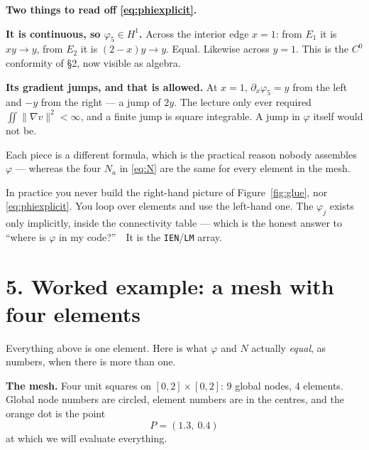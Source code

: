 \documentclass[11pt]{article}
\newcommand{\grad}{\nabla}
\begin{document}
\medskip
\textbf{Two things to read off \eqref{eq:phiexplicit}.}
\begin{steps}
\item \textbf{It is continuous, so $\varphi_{5}\in H^{1}$.} Across the interior
      edge $x=1$: from $E_{1}$ it is $xy\to y$, from $E_{2}$ it is
      $(2-x)y\to y$. Equal. Likewise across $y=1$. This is the $C^{0}$
      conformity of \S2, now visible as algebra.
\item \textbf{Its gradient jumps, and that is allowed.} At $x=1$,
      $\partial_{x}\varphi_{5}=y$ from the left and $-y$ from the right --- a
      jump of $2y$. The lecture only ever required
      $\iint\|\grad v\|^{2}<\infty$, and a finite jump is square integrable.
      A jump in $\varphi$ itself would not be.
\item Each piece is a different formula, which is the practical reason nobody
      assembles $\varphi$ --- whereas the four $N_{a}$ in \eqref{eq:N} are the
      same for every element in the mesh.
\end{steps}

\medskip
{\small\color{black!60}In practice you never build the right-hand picture of
Figure~\ref{fig:glue}, nor \eqref{eq:phiexplicit}. You loop over elements and use the
left-hand one. The $\varphi_{j}$ exists only implicitly, inside the
connectivity table --- which is the honest answer to ``where is $\varphi$ in my
code?''\ \ It is the \texttt{IEN}/\texttt{LM} array.}

\section*{5. Worked example: a mesh with four elements}

Everything above is one element. Here is what $\varphi$ and $N$ actually
\emph{equal}, as numbers, when there is more than one.

\medskip
\textbf{The mesh.} Four unit squares on $[0,2]\times[0,2]$: $9$ global nodes,
$4$ elements. Global node numbers are circled, element numbers are in the
centres, and the orange dot is the point
\[
  P=(1.3,\ 0.4)
\]
at which we will evaluate everything.
\end{document}

